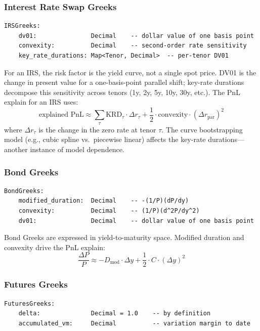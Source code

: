 \documentclass[11pt,a4paper]{article}
\begin{document}
\subsubsection{Interest Rate Swap Greeks}

\begin{lstlisting}
IRSGreeks:
    dv01:               Decimal    -- dollar value of one basis point
    convexity:          Decimal    -- second-order rate sensitivity
    key_rate_durations: Map<Tenor, Decimal>  -- per-tenor DV01
\end{lstlisting}

\noindent For an IRS, the risk factor is the yield curve, not a single spot price.  DV01 is the change in present value for a one-basis-point parallel shift; key-rate durations decompose this sensitivity across tenors (1y, 2y, 5y, 10y, 30y, etc.).  The PnL explain for an IRS uses:
\[
\text{explained PnL} \approx \sum_{\tau} \mathrm{KRD}_\tau \cdot \Delta r_\tau + \frac{1}{2} \cdot \mathrm{convexity} \cdot (\Delta r_{\text{par}})^2
\]
where $\Delta r_\tau$ is the change in the zero rate at tenor $\tau$.  The curve bootstrapping model (e.g., cubic spline vs.\ piecewise linear) affects the key-rate durations---another instance of model dependence.

\subsubsection{Bond Greeks}

\begin{lstlisting}
BondGreeks:
    modified_duration:  Decimal    -- -(1/P)(dP/dy)
    convexity:          Decimal    -- (1/P)(d^2P/dy^2)
    dv01:               Decimal    -- dollar value of one basis point
\end{lstlisting}

\noindent Bond Greeks are expressed in yield-to-maturity space.  Modified duration and convexity drive the PnL explain:
\[
\frac{\Delta P}{P} \approx -D_{\mathrm{mod}} \cdot \Delta y + \frac{1}{2} \cdot C \cdot (\Delta y)^2
\]

\subsubsection{Futures Greeks}

\begin{lstlisting}
FuturesGreeks:
    delta:              Decimal = 1.0    -- by definition
    accumulated_vm:     Decimal          -- variation margin to date
\end{lstlisting}
\end{document}
